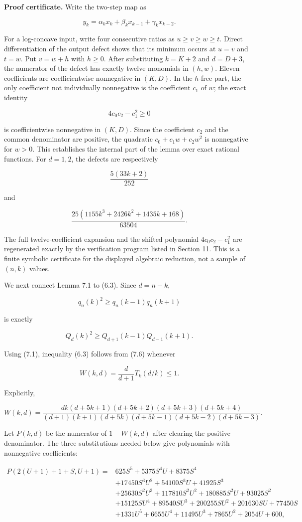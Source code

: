 \documentclass[11pt]{article}
\numberwithin{equation}{section}
\begin{document}
\textbf{Proof certificate.} Write the two-step map as

\[
y_k=\alpha_kx_k+\beta_kx_{k-1}+\gamma_kx_{k-2}.
\]

For a log-concave input, write four consecutive ratios as $u\ge v\ge w\ge t$. Direct
differentiation of the output defect shows that its minimum occurs at $u=v$ and $t=w$.
Put $v=w+h$ with $h\ge0$. After substituting $k=K+2$ and $d=D+3$, the numerator of the
defect has exactly twelve monomials in $(h,w)$. Eleven coefficients are coefficientwise
nonnegative in $(K,D)$. In the $h$-free part, the only coefficient not individually
nonnegative is the coefficient $c_1$ of $w$; the exact identity

\[
4c_0c_2-c_1^2\ge0
\]

is coefficientwise nonnegative in $(K,D)$. Since the coefficient $c_2$ and the common
denominator are positive, the quadratic $c_0+c_1w+c_2w^2$ is nonnegative for $w>0$.
This establishes the internal part of the lemma over exact rational functions. For
$d=1,2$, the defects are respectively

\[
\frac{5(33k+2)}{252}
\]

and

\[
\frac{25(1155k^3+2426k^2+1435k+168)}{63504}.
\]

The full twelve-coefficient expansion and the shifted polynomial
$4c_0c_2-c_1^2$ are regenerated exactly by the verification program listed in
Section 11. This is a finite symbolic certificate for the displayed algebraic reduction,
not a sample of $(n,k)$ values.

We next connect Lemma 7.1 to (6.3). Since $d=n-k$,

\[
q_n(k)^2\ge q_n(k-1)q_n(k+1)
\]

is exactly

\[
Q_d(k)^2\ge Q_{d+1}(k-1)Q_{d-1}(k+1).
\tag{7.6}
\]

Using (7.1), inequality (6.3) follows from (7.6) whenever

\[
W(k,d)=\frac{d}{d+1}T_k(d/k)\le1.
\tag{7.7}
\]

Explicitly,

\[
W(k,d)=
\frac{dk(d+5k+1)(d+5k+2)(d+5k+3)(d+5k+4)}
{(d+1)(k+1)(d+5k)(d+5k-1)(d+5k-2)(d+5k-3)}.
\tag{7.8}
\]

Let $P(k,d)$ be the numerator of $1-W(k,d)$ after clearing the positive denominator.
The three substitutions needed below give polynomials with nonnegative coefficients:

\[
\begin{aligned}
P(2(U+1)+1+S,U+1)
={}&625S^5+5375S^4U+8375S^4\\
&+17450S^3U^2+54100S^3U+41925S^3\\
&+25630S^2U^3+117810S^2U^2+180885S^2U+93025S^2\\
&+15125SU^4+89540SU^3+200255SU^2+201630SU+77450S\\
&+1331U^5+6655U^4+11495U^3+7865U^2+2054U+600,
\end{aligned}
\tag{7.9}
\]
\end{document}
